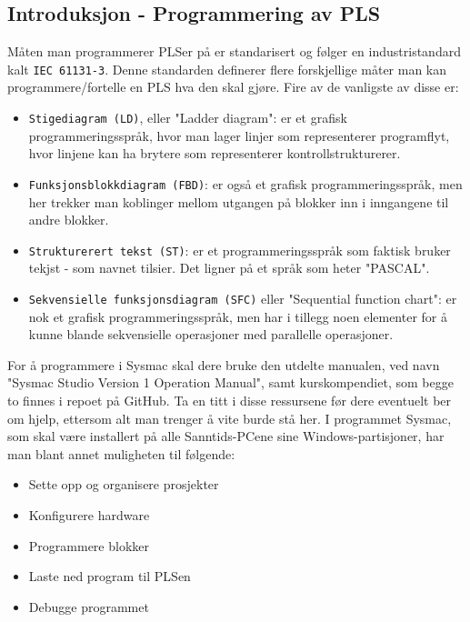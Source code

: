 \begin{alphasection}
\section{Introduksjon - Programmering av PLS}

Måten man programmerer PLSer på er standarisert og følger en industristandard kalt \verb|IEC 61131-3|. Denne standarden definerer flere forskjellige måter man kan programmere/fortelle en PLS hva den skal gjøre. Fire av de vanligste av disse er:

\begin{itemize}
    \item \verb|Stigediagram (LD)|, eller "Ladder diagram": er et grafisk programmeringsspråk, hvor man lager linjer som representerer programflyt, hvor linjene kan ha brytere som representerer kontrollstrukturerer.
    
    \item \verb|Funksjonsblokkdiagram (FBD)|: er også et grafisk programmeringsspråk, men her trekker man koblinger mellom utgangen på blokker inn i inngangene til andre blokker. 
    \item \verb|Strukturerert tekst (ST)|: er et programmeringsspråk som faktisk bruker tekjst - som navnet tilsier. Det ligner på et språk som heter "PASCAL".
    
    \item \verb|Sekvensielle funksjonsdiagram (SFC)| eller "Sequential function chart": er nok et grafisk programmeringsspråk, men har i tillegg noen elementer for å kunne blande sekvensielle operasjoner med parallelle operasjoner.
\end{itemize}

For å programmere i Sysmac skal dere bruke den utdelte manualen, ved navn "Sysmac Studio Version 1 Operation Manual", samt kurskompendiet, som begge to finnes i repoet på GitHub. Ta en titt i disse ressursene før dere eventuelt ber om hjelp, ettersom alt man trenger å vite burde stå her. I programmet Sysmac, som skal være installert på alle Sanntids-PCene sine Windows-partisjoner, har man blant annet muligheten til følgende:

\begin{itemize}
    \item Sette opp og organisere prosjekter
    \item Konfigurere hardware
    \item Programmere blokker
    \item Laste ned program til PLSen
    \item Debugge programmet
\end{itemize}


\end{alphasection}
